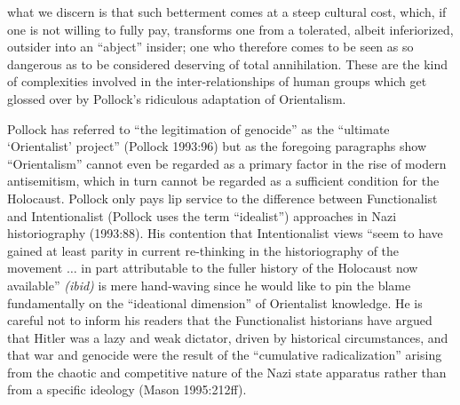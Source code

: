 what we discern is that such betterment comes at a steep cultural cost, which, if one is not willing to fully pay, transforms one from a tolerated, albeit inferiorized, outsider into an “abject” insider; one who therefore comes to be seen as so dangerous as to be considered deserving of total annihilation. These are the kind of complexities involved in the inter-relationships of human groups which get glossed over by Pollock’s ridiculous adaptation of Orientalism.

Pollock has referred to “the legitimation of genocide” as the “ultimate ‘Orientalist’ project” (Pollock 1993:96) but as the foregoing paragraphs show “Orientalism” cannot even be regarded as a primary factor in the rise of modern antisemitism, which in turn cannot be regarded as a sufficient condition for the Holocaust. Pollock only pays lip service to the difference between Functionalist and Intentionalist (Pollock uses the term “idealist”) approaches in Nazi historiography (1993:88). His contention that Intentionalist views “seem to have gained at least parity in current re-thinking in the historiography of the movement $\ldots$ in part attributable to the fuller history of the Holocaust now available” {\sl (ibid)} is mere hand-waving since he would like to pin the blame fundamentally on the “ideational dimension” of Orientalist knowledge. He is careful not to inform his readers that the Functionalist historians have argued that Hitler was a lazy and weak dictator, driven by historical circumstances, and that war and genocide were the result of the “cumulative radicalization” arising from the chaotic and competitive nature of the Nazi state apparatus rather than from a specific ideology (Mason 1995:212ff). 

